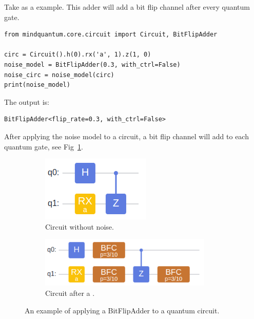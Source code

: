 Take \BitFlipAdder as a example. This adder will add a bit flip channel after every quantum gate.
\begin{lstlisting}
from mindquantum.core.circuit import Circuit, BitFlipAdder

circ = Circuit().h(0).rx('a', 1).z(1, 0)
noise_model = BitFlipAdder(0.3, with_ctrl=False)
noise_circ = noise_model(circ)
print(noise_model)
\end{lstlisting}
The output is:
\begin{lstlisting}
BitFlipAdder<flip_rate=0.3, with_ctrl=False>
\end{lstlisting}
After applying the noise model to a circuit, a bit flip channel will add to each quantum gate, see Fig~\ref{fig:bit_flip_adder}.
\begin{figure}
    \centering
    \begin{subfigure}{0.2\textwidth}
        \centering
        \includegraphics[width=\textwidth]{images/4_3_no_bit_fip.png}
        \caption{Circuit without noise.}
    \end{subfigure}
    \begin{subfigure}{0.4\textwidth}
        \centering
        \includegraphics[width=0.9\textwidth]{images/4_3_bit_fip.png}
        \caption{Circuit after a .}
    \end{subfigure}
    \caption{An example of applying a BitFlipAdder to a quantum circuit.}
    \label{fig:bit_flip_adder}
\end{figure}

